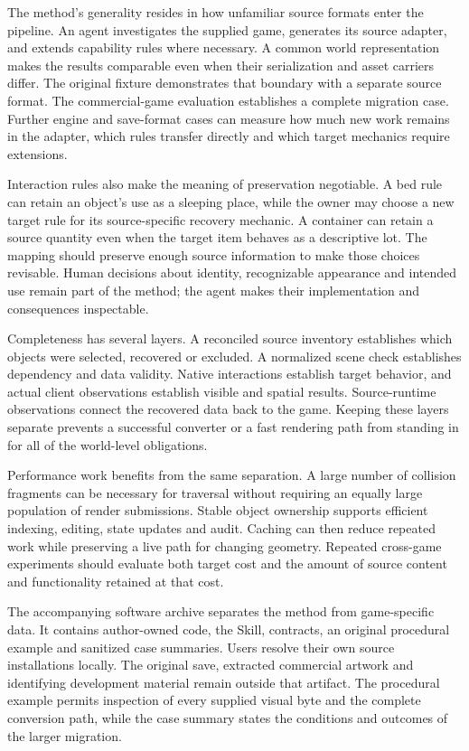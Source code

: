 \documentclass[11pt]{article}
\begin{document}
The method's generality resides in how unfamiliar source formats enter the
pipeline. An agent investigates the supplied game, generates its source adapter,
and extends capability rules where necessary. A common world representation
makes the results comparable even when their serialization and asset carriers
differ. The original fixture demonstrates that boundary with a separate source
format. The commercial-game evaluation establishes a complete migration case.
Further engine and save-format cases can measure how much new work remains in
the adapter, which rules transfer directly and which target mechanics require
extensions.

Interaction rules also make the meaning of preservation negotiable. A bed rule
can retain an object's use as a sleeping place, while the owner may choose a new
target rule for its source-specific recovery mechanic. A container can retain a
source quantity even when the target item behaves as a descriptive lot. The
mapping should preserve enough source information to make those choices
revisable. Human decisions about identity, recognizable appearance and intended
use remain part of the method; the agent makes their implementation and
consequences inspectable.

Completeness has several layers. A reconciled source inventory establishes
which objects were selected, recovered or excluded. A normalized scene check
establishes dependency and data validity. Native interactions establish target
behavior, and actual client observations establish visible and spatial results.
Source-runtime observations connect the recovered data back to the game. Keeping
these layers separate prevents a successful converter or a fast rendering path
from standing in for all of the world-level obligations.

Performance work benefits from the same separation. A large number of collision
fragments can be necessary for traversal without requiring an equally large
population of render submissions. Stable object ownership supports efficient
indexing, editing, state updates and audit. Caching can then reduce repeated work
while preserving a live path for changing geometry. Repeated cross-game
experiments should evaluate both target cost and the amount of source content
and functionality retained at that cost.

The accompanying software archive separates the method from game-specific data.
It contains author-owned code, the Skill, contracts, an original procedural
example and sanitized case summaries. Users resolve their own source installations locally.
The original save, extracted commercial artwork and identifying development
material remain outside that artifact. The procedural example permits inspection
of every supplied visual byte and the complete conversion path, while the case
summary states the conditions and outcomes of the larger migration.
\end{document}
